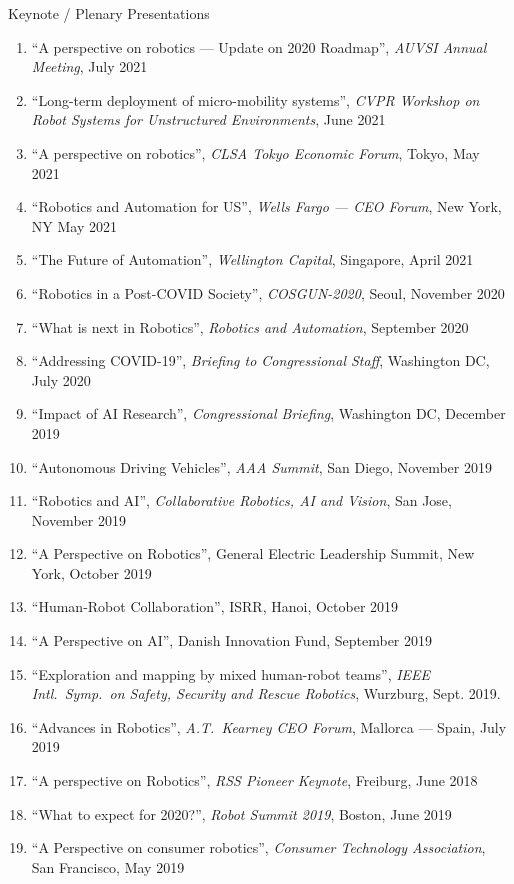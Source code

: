 \documentclass{article}
\begin{document}
\begin{cv}
\begin{cvlist}{Keynote / Plenary Presentations}
\begin{enumerate}
			\item ``A perspective on robotics --- Update on 2020 Roadmap'', {\em AUVSI
					      Annual Meeting}, July 2021
			\item ``Long-term deployment of micro-mobility systems'', {\em CVPR Workshop on
					      Robot Systems for Unstructured Environments}, June 2021
			\item ``A perspective on robotics'', {\em CLSA Tokyo Economic Forum}, Tokyo, May
			      2021
			\item ``Robotics and Automation for US'', {\em Wells Fargo --- CEO Forum}, New
			      York, NY May 2021
			\item ``The Future of Automation'', {\em Wellington Capital}, Singapore,
			      April 2021
			\item ``Robotics in a Post-COVID Society'', {\em COSGUN-2020}, Seoul, November
			      2020
			\item ``What is next in Robotics'', {\em Robotics and Automation}, September
			      2020
			\item ``Addressing COVID-19'', {\em Briefing to Congressional Staff}, Washington
			      DC, July 2020
			\item ``Impact of AI Research'', {\em Congressional Briefing}, Washington DC,
			      December 2019
			\item ``Autonomous Driving Vehicles'', {\em AAA Summit}, San Diego, November
			      2019
			\item ``Robotics and AI'', {\em Collaborative Robotics, AI and Vision}, San
			      Jose, November 2019
			\item ``A Perspective on Robotics'', General Electric Leadership Summit, New
			      York, October 2019
			\item ``Human-Robot Collaboration'', ISRR, Hanoi, October 2019
			\item ``A Perspective on AI'', Danish Innovation Fund, September 2019
			\item ``Exploration and mapping by mixed human-robot teams'', {\em
					      IEEE Intl.\ Symp.\ on Safety, Security and Rescue Robotics}, Wurzburg, Sept. 2019.
			\item  ``Advances in Robotics'', {\em A.T.\ Kearney CEO Forum}, Mallorca --- Spain, July 2019
			\item ``A perspective on Robotics'', {\em RSS Pioneer Keynote}, Freiburg, June 2018
			\item ``What to expect for 2020?'', {\em Robot Summit 2019}, Boston, June 2019
			\item ``A Perspective on consumer robotics'', {\em Consumer Technology Association}, San Francisco, May 2019

\end{enumerate}
\end{cvlist}
\end{cv}
\end{document}
